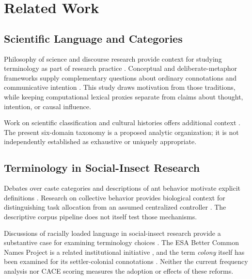 \documentclass[
]{article}
\numberwithin{equation}{section}
\begin{document}
\clearpage

\section{Related Work}\label{sec:related_work}

\subsection{Scientific Language and
Categories}\label{scientific-language-and-categories}

Philosophy of science and discourse research provide context for
studying terminology as part of research practice
\citep{kuhn1996, latour1987, longino1990, fairclough1992, wodak2009methods}.
Conceptual and deliberate-metaphor frameworks supply complementary
questions about ordinary connotations and communicative intention
\citep{lakoff1980metaphors, steen2017deliberate}. This study draws
motivation from those traditions, while keeping computational lexical
proxies separate from claims about thought, intention, or causal
influence.

Work on scientific classification and cultural histories offers
additional context
\citep{berlin1992, hacking1999social, sleigh2007ants}. The present
six-domain taxonomy is a proposed analytic organization; it is not
independently established as exhaustive or uniquely appropriate.

\subsection{Terminology in Social-Insect
Research}\label{terminology-in-social-insect-research}

Debates over caste categories and descriptions of ant behavior motivate
explicit definitions
\citep{gordon1992wittgenstein, boomsma2018superorganismality}. Research
on collective behavior provides biological context for distinguishing
task allocation from an assumed centralized controller
\citep{gordon2010, gordon2019ecology, gordon2023ecology}. The
descriptive corpus pipeline does not itself test those mechanisms.

Discussions of racially loaded language in social-insect research
provide a substantive case for examining terminology choices
\citep{herbers2006, herbers2007}. The ESA Better Common Names Project is
a related institutional initiative \citep{betternamesproject2024}, and
the term \emph{colony} itself has been examined for its settler-colonial
connotations \citep{vis2026colony}. Neither the current frequency
analysis nor CACE scoring measures the adoption or effects of these
reforms.
\end{document}
